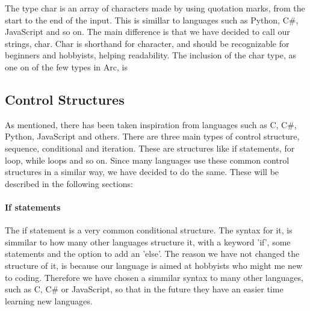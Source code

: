 The type char is an array of characters made by using quotation marks, from the start to the end of the input.  This is simillar to languages such as Python, C\#, JavaScript and so on. The main difference is that we have decided to call our strings, char. Char is shorthand for character, and should be recognizable for beginners and hobbyists, helping readability. The inclusion of the char type, as one on of the few types in Arc, is 
 
\subsection{Control Structures}
As mentioned, there has been taken inspiration from languages such as C, C\#, Python, JavaScript and others. There are three main types of control structure, sequence, conditional and iteration. These are structures like if statements, for loop, while loops and so on. Since many languages use these common control structures in a similar way, we have decided to do the same. These will be described in the following sections:

\paragraph*{If statements}
The if statement is a very common conditional structure. The syntax for it, is simmilar to how many other languages structure it, with a keyword 'if', some statements and the option to add an 'else'. The reason we have not changed the structure of it, is because our language is aimed at hobbyists who might me new to coding. Therefore we have chosen a simmilar syntax to many other languages, such as C, C\# or JavaScript, so that in the future they have an easier time learning new languages.





